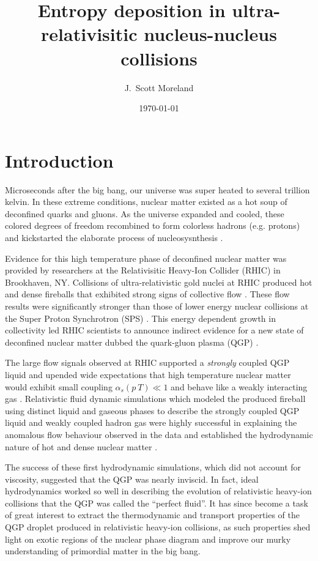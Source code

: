 \documentclass[aps,prc,reprint,amsmath,nofootinbib]{revtex4-1}
\begin{document}
\title{Entropy deposition in ultra-relativisitic nucleus-nucleus collisions}

\author{J.\ Scott Moreland}
\date{\today}

\maketitle

\section{Introduction}

Microseconds after the big bang, our universe was super heated to several trillion kelvin. In these extreme conditions, nuclear matter existed as a hot 
soup of deconfined quarks and gluons. As the universe expanded and cooled, these colored degrees of freedom recombined to 
form colorless hadrons (e.g. protons) and kickstarted the elaborate process of nucleosysnthesis \cite{Heinz:2004qz}.

Evidence for this high temperature phase of deconfined nuclear matter was provided by researchers at the Relativisitic Heavy-Ion Collider (RHIC) 
in Brookhaven, NY. Collisions of ultra-relativistic gold nuclei at RHIC produced hot and dense fireballs that exhibited strong signs of collective flow 
\cite{Adams:2005dq}. These flow results were significantly stronger than those of lower energy nuclear collisions at the Super Proton Synchrotron (SPS) 
\cite{Shuryak:2004cy}. This energy dependent growth in collectivity led RHIC scientists to announce indirect evidence for a new state of deconfined nuclear 
matter dubbed the quark-gluon plasma (QGP) \cite{BNL}.

The large flow signals observed at RHIC supported a \emph{strongly} coupled QGP liquid and upended wide expectations that high temperature nuclear matter 
would exhibit small coupling $\alpha_s(p~T) \ll 1$ and behave like a weakly interacting gas \cite{Shuryak:2004cy}. Relativistic fluid dynamic simulations which modeled 
the produced fireball using distinct liquid and gaseous phases to describe the strongly coupled QGP liquid and weakly coupled hadron gas were highly successful in 
explaining the anomalous flow behaviour observed in the data and established the hydrodynamic nature of hot and dense nuclear matter \cite{Kolb:2003dz}.

The success of these first hydrodynamic simulations, which did not account for viscosity, suggested that the QGP was nearly inviscid. In fact, ideal hydrodynamics 
worked so well in describing the evolution of relativistic heavy-ion collisions that the QGP was called the ``perfect fluid''. It has since become a task of great 
interest to extract the thermodynamic and transport properties of the QGP droplet produced in relativistic heavy-ion collisions, as such properties shed light on
exotic regions of the nuclear phase diagram and improve our murky understanding of primordial matter in the big bang.
\end{document}

